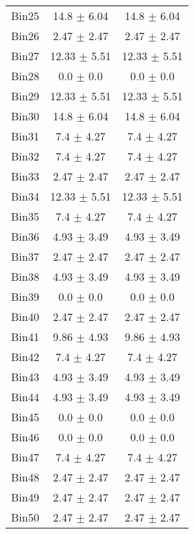\begin{tabular}{|c|c|c|}
     Bin25 & 14.8 $\pm$ 6.04 & 14.8 $\pm$ 6.04 \\ \cline{1-3} 
     Bin26 & 2.47 $\pm$ 2.47 & 2.47 $\pm$ 2.47 \\ \cline{1-3} 
     Bin27 & 12.33 $\pm$ 5.51 & 12.33 $\pm$ 5.51 \\ \cline{1-3} 
     Bin28 & 0.0 $\pm$ 0.0 & 0.0 $\pm$ 0.0 \\ \cline{1-3} 
     Bin29 & 12.33 $\pm$ 5.51 & 12.33 $\pm$ 5.51 \\ \cline{1-3} 
     Bin30 & 14.8 $\pm$ 6.04 & 14.8 $\pm$ 6.04 \\ \cline{1-3} 
     Bin31 & 7.4 $\pm$ 4.27 & 7.4 $\pm$ 4.27 \\ \cline{1-3} 
     Bin32 & 7.4 $\pm$ 4.27 & 7.4 $\pm$ 4.27 \\ \cline{1-3} 
     Bin33 & 2.47 $\pm$ 2.47 & 2.47 $\pm$ 2.47 \\ \cline{1-3} 
     Bin34 & 12.33 $\pm$ 5.51 & 12.33 $\pm$ 5.51 \\ \cline{1-3} 
     Bin35 & 7.4 $\pm$ 4.27 & 7.4 $\pm$ 4.27 \\ \cline{1-3} 
     Bin36 & 4.93 $\pm$ 3.49 & 4.93 $\pm$ 3.49 \\ \cline{1-3} 
     Bin37 & 2.47 $\pm$ 2.47 & 2.47 $\pm$ 2.47 \\ \cline{1-3} 
     Bin38 & 4.93 $\pm$ 3.49 & 4.93 $\pm$ 3.49 \\ \cline{1-3} 
     Bin39 & 0.0 $\pm$ 0.0 & 0.0 $\pm$ 0.0 \\ \cline{1-3} 
     Bin40 & 2.47 $\pm$ 2.47 & 2.47 $\pm$ 2.47 \\ \cline{1-3} 
     Bin41 & 9.86 $\pm$ 4.93 & 9.86 $\pm$ 4.93 \\ \cline{1-3} 
     Bin42 & 7.4 $\pm$ 4.27 & 7.4 $\pm$ 4.27 \\ \cline{1-3} 
     Bin43 & 4.93 $\pm$ 3.49 & 4.93 $\pm$ 3.49 \\ \cline{1-3} 
     Bin44 & 4.93 $\pm$ 3.49 & 4.93 $\pm$ 3.49 \\ \cline{1-3} 
     Bin45 & 0.0 $\pm$ 0.0 & 0.0 $\pm$ 0.0 \\ \cline{1-3} 
     Bin46 & 0.0 $\pm$ 0.0 & 0.0 $\pm$ 0.0 \\ \cline{1-3} 
     Bin47 & 7.4 $\pm$ 4.27 & 7.4 $\pm$ 4.27 \\ \cline{1-3} 
     Bin48 & 2.47 $\pm$ 2.47 & 2.47 $\pm$ 2.47 \\ \cline{1-3} 
     Bin49 & 2.47 $\pm$ 2.47 & 2.47 $\pm$ 2.47 \\ \cline{1-3} 
     Bin50 & 2.47 $\pm$ 2.47 & 2.47 $\pm$ 2.47 \\ \cline{1-3} 

\end{tabular}
